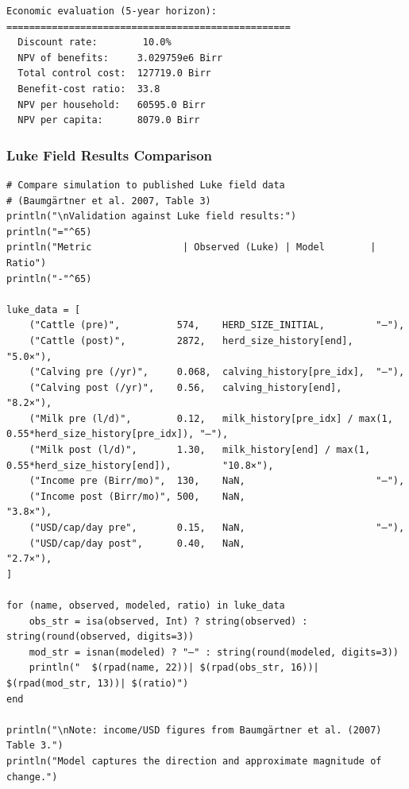 \begin{verbatim}
Economic evaluation (5-year horizon):
==================================================
  Discount rate:        10.0%
  NPV of benefits:     3.029759e6 Birr
  Total control cost:  127719.0 Birr
  Benefit-cost ratio:  33.8
  NPV per household:   60595.0 Birr
  NPV per capita:      8079.0 Birr
\end{verbatim}



\subsubsection{Luke Field Results Comparison}



\label{15340181134412694337}{}



\begin{verbatim}
# Compare simulation to published Luke field data
# (Baumgärtner et al. 2007, Table 3)
println("\nValidation against Luke field results:")
println("="^65)
println("Metric                | Observed (Luke) | Model        | Ratio")
println("-"^65)

luke_data = [
    ("Cattle (pre)",          574,    HERD_SIZE_INITIAL,         "—"),
    ("Cattle (post)",         2872,   herd_size_history[end],    "5.0×"),
    ("Calving pre (/yr)",     0.068,  calving_history[pre_idx],  "—"),
    ("Calving post (/yr)",    0.56,   calving_history[end],      "8.2×"),
    ("Milk pre (l/d)",        0.12,   milk_history[pre_idx] / max(1, 0.55*herd_size_history[pre_idx]), "—"),
    ("Milk post (l/d)",       1.30,   milk_history[end] / max(1, 0.55*herd_size_history[end]),         "10.8×"),
    ("Income pre (Birr/mo)",  130,    NaN,                       "—"),
    ("Income post (Birr/mo)", 500,    NaN,                       "3.8×"),
    ("USD/cap/day pre",       0.15,   NaN,                       "—"),
    ("USD/cap/day post",      0.40,   NaN,                       "2.7×"),
]

for (name, observed, modeled, ratio) in luke_data
    obs_str = isa(observed, Int) ? string(observed) : string(round(observed, digits=3))
    mod_str = isnan(modeled) ? "—" : string(round(modeled, digits=3))
    println("  $(rpad(name, 22))| $(rpad(obs_str, 16))| $(rpad(mod_str, 13))| $(ratio)")
end

println("\nNote: income/USD figures from Baumgärtner et al. (2007) Table 3.")
println("Model captures the direction and approximate magnitude of change.")
\end{verbatim}




